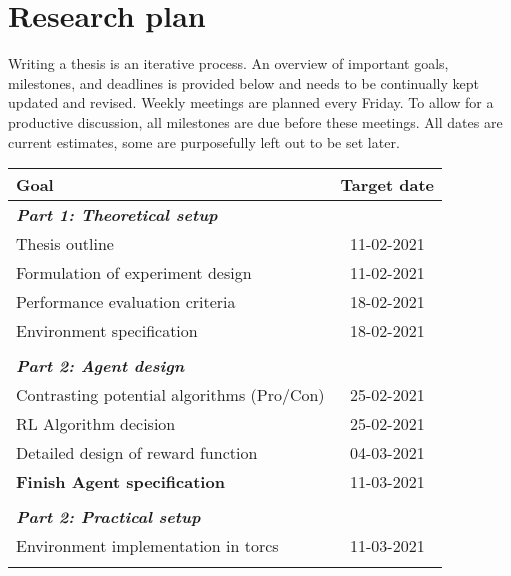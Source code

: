 \chapter{Research plan}
\label{sec:plan}

Writing a thesis is an iterative process. An overview of important goals, milestones, and deadlines is provided below and needs to be continually kept updated and revised. Weekly meetings are planned every Friday. To allow for a productive discussion, all milestones are due before these meetings. All dates are current estimates, some are purposefully left out to be set later.

\begingroup
    \centering
    \setlength\LTleft{0pt}
    \setlength\LTright{0pt}
    \begin{longtable}{l @{\extracolsep{\fill}} c}
        \toprule
        \textbf{Goal} & \textbf{Target date} \\ \midrule
        
        \textit{\textbf{Part 1: Theoretical setup}} &  \\ 
        Thesis outline    & 11-02-2021           \\\hdashline[1pt/10pt]
        Formulation of experiment design    & 11-02-2021 \\\hdashline[1pt/10pt]
        Performance evaluation criteria & 18-02-2021        \\\hdashline[1pt/10pt]
        Environment specification    & 18-02-2021           \\\hdashline[1pt/10pt] 
         
         & \\
        \textit{\textbf{Part 2: Agent design}} &  \\ 
        Contrasting potential algorithms (Pro/Con)    & 25-02-2021  \\\hdashline[1pt/10pt] 
        RL Algorithm decision    & 25-02-2021           \\\hdashline[1pt/10pt] 
        Detailed design of reward function    & 04-03-2021           \\\hdashline[1pt/10pt]
        \textbf{Finish Agent specification}    & 11-03-2021           \\\hdashline[1pt/10pt]
        
         & \\
        \textit{\textbf{Part 2: Practical setup}} &  \\ 
        Environment implementation in \gls{torcs}    & 11-03-2021           \\\hdashline[1pt/10pt] 
        

\end{longtable}
